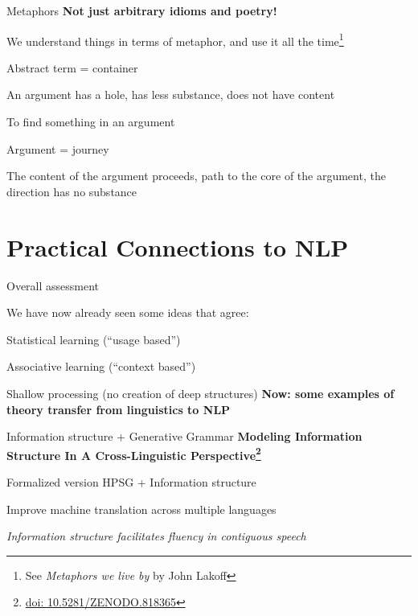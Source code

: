 \documentclass[aspectratio=169,cramped]{beamer}
\let\tempone\itemize
\let\temptwo\enditemize
\renewenvironment{itemize}{\tempone\addtolength{\itemsep}{-0\baselineskip}\addtolength{\parskip}{-0.2\baselineskip}}{\temptwo}
\newcommand{\ex}[1]{{\color{teal} #1}}
\newcommand*{\doi}[1]{\href{http://doai.io/#1}{doi: #1}}
\begin{document}
\begin{frame}{Metaphors}
	\textbf{Not just arbitrary idioms and poetry!}
\begin{itemize}
  \item We understand things in terms of metaphor, and use it all the time\footnote{See
      \textit{Metaphors we live by} by John Lakoff}
  \item Abstract term = container
    \begin{itemize}
    \item \ex{An argument has a hole, has less substance, does not have content}
    \item \ex{To find something in an argument}
    \end{itemize}
  \item Argument = journey
    \begin{itemize}
    \item \ex{The content of the argument proceeds, path to the core of the argument, the direction
        has no substance}
    \end{itemize}
  \end{itemize}
\end{frame}


\section{Practical Connections to NLP}

\begin{frame}{Overall assessment}
  \begin{itemize}
  \item We have now already seen some ideas that agree:
    \begin{itemize}
    \item Statistical learning (``usage based'')
    \item Associative learning (``context based'')
    \item Shallow processing (no creation of deep structures)
    \end{itemize}
  \end{itemize}
  \textbf{Now: some examples of theory transfer from linguistics to NLP}
\end{frame}


\begin{frame}{Information structure + Generative Grammar}
	\textbf{Modeling Information Structure In A Cross-Linguistic Perspective\footnote{\protect\doi{10.5281/ZENODO.818365}}}
  \begin{itemize}
  \item Formalized version HPSG + Information structure
  \item Improve machine translation across multiple languages
  \item \textit{Information structure facilitates fluency in contiguous speech}
  \end{itemize}
\end{frame}
\end{document}
